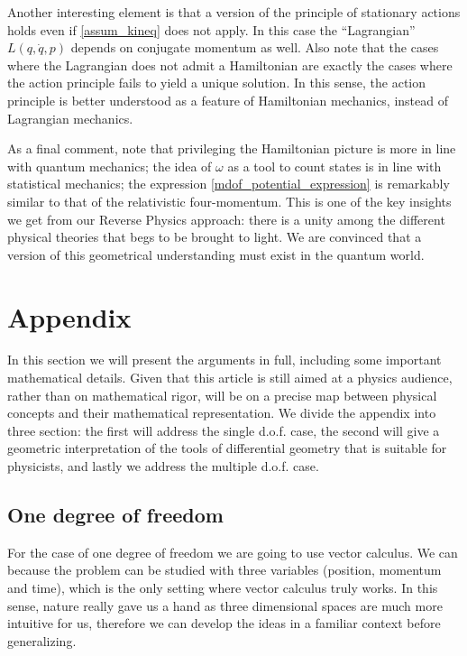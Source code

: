 \documentclass[10pt,twocolumn, nofootinbib]{revtex4-2}
\begin{document}
Another interesting element is that a version of the principle of stationary actions holds even if \ref{assum_kineq} does not apply. In this case the ``Lagrangian'' $L(q,\dot{q},p)$ depends on conjugate momentum as well. Also note that the cases where the Lagrangian does not admit a Hamiltonian are exactly the cases where the action principle fails to yield a unique solution. In this sense, the action principle is better understood as a feature of Hamiltonian mechanics, instead of Lagrangian mechanics.

As a final comment, note that privileging the Hamiltonian picture is more in line with quantum mechanics; the idea of $\omega$ as a tool to count states is in line with statistical mechanics; the expression \ref{mdof_potential_expression} is remarkably similar to that of the relativistic four-momentum. This is one of the key insights we get from our Reverse Physics approach: there is a unity among the different physical theories that begs to be brought to light. We are convinced that a version of this geometrical understanding must exist in the quantum world.




\section*{Appendix}

In this section we will present the arguments in full, including some important mathematical details. Given that this article is still aimed at a physics audience, rather than on mathematical rigor, will be on a precise map between physical concepts and their mathematical representation. We divide the appendix into three section: the first will address the single d.o.f. case, the second will give a geometric interpretation of the tools of differential geometry that is suitable for physicists, and lastly we address the multiple d.o.f. case.

\subsection*{One degree of freedom}

For the case of one degree of freedom we are going to use vector calculus. We can because the problem can be studied with three variables (position, momentum and time), which is the only setting where vector calculus truly works. In this sense, nature really gave us a hand as three dimensional spaces are much more intuitive for us, therefore we can develop the ideas in a familiar context before generalizing.
\end{document}
